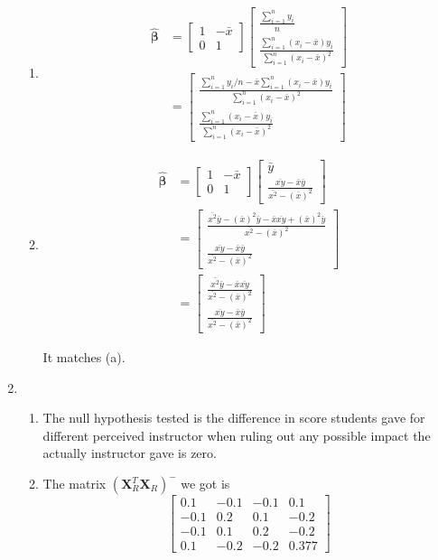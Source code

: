 \documentclass{article}
\begin{document}
\begin{enumerate}[leftmargin = 0 em, label = \arabic*., font = \bfseries]
\begin{enumerate}
\item 
\begin{align*}
\hat{\bm \beta} & = \begin{bmatrix}
	1 & - \bar{x}\\
	0 & 1
\end{bmatrix}\begin{bmatrix}
	\frac{\sum_{i=1}^n y_i}{n}\\
	\frac{\sum_{i=1}^n (x_i - \bar{x})y_i}{\sum_{i=1}^n (x_i - \bar{x})^2}
\end{bmatrix} \\
& = \begin{bmatrix}
	\frac{\sum_{i=1}^n y_i / n - \bar{x} \sum_{i=1}^n (x_i - \bar{x}) y_i}{\sum_{i=1}^n (x_i - \bar{x})^2}\\
	\frac{\sum_{i=1}^n (x_i - \bar{x})y_i}{\sum_{i=1}^n (x_i - \bar{x})^2}
\end{bmatrix}
\end{align*}
\item 
\begin{align*}
\hat{\bm \beta} & = \begin{bmatrix}
	1 & -\bar{x}\\
	0 & 1
\end{bmatrix} \begin{bmatrix}
	\bar{y}\\
	\frac{\bar{xy} - \bar{x}\bar{y}}{\bar{x^2} - (\bar{x})^2}
\end{bmatrix}\\
& = \begin{bmatrix}
	\frac{\bar{x^2} \bar{y} - (\bar{x})^2 \bar{y} - \bar{x} \bar{xy} + (\bar{x})^2 \bar{y}}{\bar{x^2} - (\bar{x})^2}\\
	\frac{\bar{xy} - \bar{x}\bar{y}}{\bar{x^2} - (\bar{x})^2}
\end{bmatrix}\\
& = \begin{bmatrix}
		\frac{\bar{x^2} \bar{y} - \bar{x}\bar{xy}}{\bar{x^2} - (\bar{x})^2}\\
		\frac{\bar{xy} - \bar{x}\bar{y}}{\bar{x^2} - (\bar{x})^2}
	\end{bmatrix}
\end{align*}

It matches (a).
	\end{enumerate}

	\item 
	\begin{enumerate}
		\item 
		The null hypothesis tested is the difference in score students gave for different perceived instructor when ruling out any possible impact the actually instructor gave is zero.
		\item 
		The matrix $(\bm X_{R}^T \bm X_{R})^-$ we got is  
		\[\begin{bmatrix}
			0.1 & -0.1 & -0.1 & 0.1\\
			-0.1 & 0.2 & 0.1 & -0.2 \\
			-0.1 & 0.1 & 0.2 & -0.2\\
			0.1 & -0.2 & -0.2 & 0.377
		\end{bmatrix}\]


\end{enumerate}
\end{enumerate}
\end{document}
